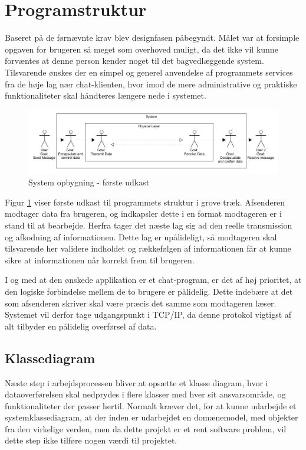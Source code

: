 \section{Programstruktur}
Baseret på de førnævnte krav blev designfasen påbegyndt. Målet var at forsimple opgaven for brugeren så meget som overhoved muligt, da det ikke vil kunne forvæntes at denne person kender noget til det bagvedlæggende system. 
Tilsvarende ønskes der en simpel og generel anvendelse af programmets services fra de høje lag nær chat-klienten, hvor imod de mere administrative og praktiske funktionaliteter skal håndteres længere nede i systemet.

\begin{figure}[h!]
\centering
\includegraphics[scale=0.5]{Billeder/ProgramOpbygning1.JPG}
\caption{System opbygning - første udkast}
\label{fig:Blokdiagram}
\end{figure}

Figur \ref{fig:Blokdiagram} viser første udkast til programmets struktur i grove træk. Afsenderen modtager data fra brugeren, og indkapsler dette i en format modtageren er i stand til at bearbejde. Herfra tager det næste lag sig ad den reelle transmission og afkodning af informationen. Dette lag er upålideligt, så modtageren skal tilsvarende her validere indholdet og rækkefølgen af informationen får at kunne sikre at informationen når korrekt frem til brugeren. 

I og med at den ønskede applikation er et chat-program, er det af høj prioritet, at den logiske forbindelse mellem de to brugere er pålidelig. Dette indebære at det som afsenderen skriver skal være præcis det samme som modtageren læser. Systemet vil derfor tage udgangspunkt i TCP/IP, da denne protokol vigtigst af alt tilbyder en pålidelig overførsel af data. 



\subsection{Klassediagram}
Næste step i arbejdsprocessen bliver at opsætte et klasse diagram, hvor i dataoverførelsen skal nedprydes i flere klasser med hver sit ansvarsområde, og funktionaliteter der passer hertil. Normalt kræver det, for at kunne udarbejde et systemklassediagram, at der inden er udarbejdet en domænemodel, med objekter fra den virkelige verden, men da dette projekt er et rent software problem, vil dette step ikke tilføre nogen værdi til projektet. 

